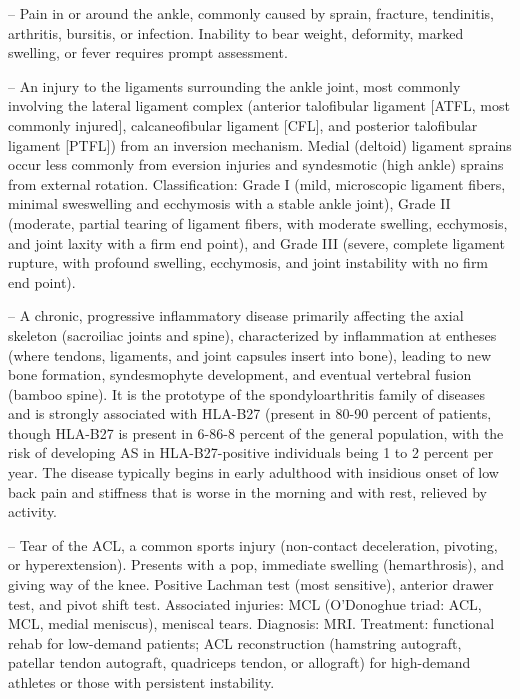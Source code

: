 -- Pain in or around the ankle, commonly caused by sprain, fracture, tendinitis, arthritis, bursitis, or infection. Inability to bear weight, deformity, marked swelling, or fever requires prompt assessment.

-- An injury to the ligaments surrounding the ankle joint, most commonly involving the lateral ligament complex (anterior talofibular ligament [ATFL, most commonly injured], calcaneofibular ligament [CFL], and posterior talofibular ligament [PTFL]) from an inversion mechanism. Medial (deltoid) ligament sprains occur less commonly from eversion injuries and syndesmotic (high ankle) sprains from external rotation. Classification: Grade I (mild, microscopic ligament fibers, minimal sweswelling and ecchymosis with a stable ankle joint), Grade II (moderate, partial tearing of ligament fibers, with moderate swelling, ecchymosis, and joint laxity with a firm end point), and Grade III (severe, complete ligament rupture, with profound swelling, ecchymosis, and joint instability with no firm end point).

-- A chronic, progressive inflammatory disease primarily affecting the axial skeleton (sacroiliac joints and spine), characterized by inflammation at entheses (where tendons, ligaments, and joint capsules insert into bone), leading to new bone formation, syndesmophyte development, and eventual vertebral fusion (bamboo spine). It is the prototype of the spondyloarthritis family of diseases and is strongly associated with HLA-B27 (present in 80-90 percent of patients, though HLA-B27 is present in 6-86-8 percent of the general population, with the risk of developing AS in HLA-B27-positive individuals being 1 to 2 percent per year. The disease typically begins in early adulthood with insidious onset of low back pain and stiffness that is worse in the morning and with rest, relieved by activity.

-- Tear of the ACL, a common sports injury (non-contact deceleration, pivoting, or hyperextension). Presents with a pop, immediate swelling (hemarthrosis), and giving way of the knee. Positive Lachman test (most sensitive), anterior drawer test, and pivot shift test. Associated injuries: MCL (O'Donoghue triad: ACL, MCL, medial meniscus), meniscal tears. Diagnosis: MRI. Treatment: functional rehab for low-demand patients; ACL reconstruction (hamstring autograft, patellar tendon autograft, quadriceps tendon, or allograft) for high-demand athletes or those with persistent instability.

